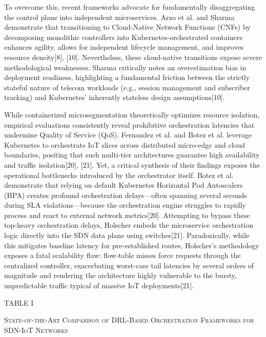 To overcome this, recent frameworks advocate for fundamentally disaggregating the control plane into independent microservices. Arzo et al. and Sharma demonstrate that transitioning to Cloud-Native Network Functions (CNFs) by decomposing monolithic controllers into Kubernetes-orchestrated containers enhances agility, allows for independent lifecycle management, and improves resource density{[}8{]}, {[}10{]}. Nevertheless, these cloud-native transitions expose severe methodological weaknesses. Sharma critically notes an overestimation bias in deployment readiness, highlighting a fundamental friction between the strictly stateful nature of telecom workloads (e.g., session management and subscriber tracking) and Kubernetes' inherently stateless design assumptions{[}10{]}.

While containerized microsegmentation theoretically optimizes resource isolation, empirical evaluations consistently reveal prohibitive orchestration latencies that undermine Quality of Service (QoS). Fernandez et al. and Botez et al. leverage Kubernetes to orchestrate IoT slices across distributed micro-edge and cloud boundaries, positing that such multi-tier architectures guarantee high availability and traffic isolation{[}20{]}, {[}21{]}. Yet, a critical synthesis of their findings exposes the operational bottlenecks introduced by the orchestrator itself. Botez et al. demonstrate that relying on default Kubernetes Horizontal Pod Autoscalers (HPA) creates profound orchestration delays---often spanning several seconds during SLA violations---because the orchestration engine struggles to rapidly process and react to external network metrics{[}20{]}. Attempting to bypass these top-heavy orchestration delays, Holscher embeds the microservice orchestration logic directly into the SDN data plane using switches{[}21{]}. Paradoxically, while this mitigates baseline latency for pre-established routes, Holscher's methodology exposes a fatal scalability flaw: flow-table misses force requests through the centralized controller, exacerbating worst-case tail latencies by several orders of magnitude and rendering the architecture highly vulnerable to the bursty, unpredictable traffic typical of massive IoT deployments{[}21{]}.

TABLE I

\textsc{State-of-the-Art Comparison of DRL-Based Orchestration Frameworks for SDN-IoT Networks}

